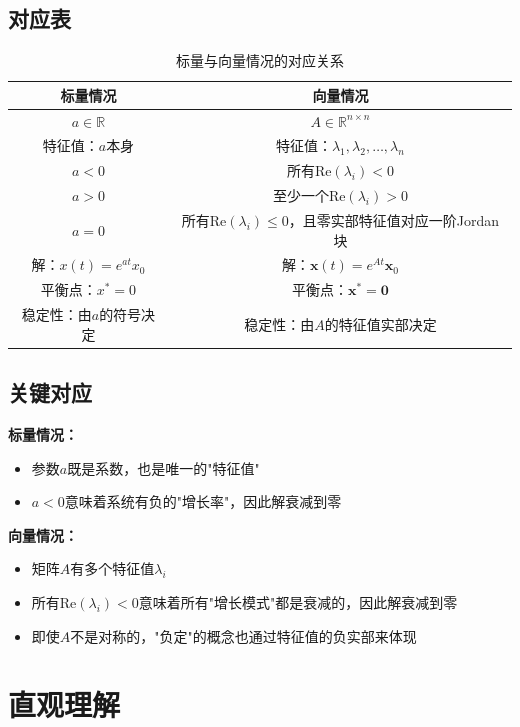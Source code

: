 \documentclass[12pt,a4paper]{article}
\begin{document}
\subsection{对应表}

\begin{table}[h]
\centering
\begin{tabular}{|c|c|}
\hline
\textbf{标量情况} & \textbf{向量情况} \\
\hline
$a \in \mathbb{R}$ & $A \in \mathbb{R}^{n \times n}$ \\
\hline
特征值：$a$本身 & 特征值：$\lambda_1, \lambda_2, \ldots, \lambda_n$ \\
\hline
$a < 0$ & 所有$\text{Re}(\lambda_i) < 0$ \\
\hline
$a > 0$ & 至少一个$\text{Re}(\lambda_i) > 0$ \\
\hline
$a = 0$ & 所有$\text{Re}(\lambda_i) \leq 0$，且零实部特征值对应一阶Jordan块 \\
\hline
解：$x(t) = e^{at}x_0$ & 解：$\mathbf{x}(t) = e^{At}\mathbf{x}_0$ \\
\hline
平衡点：$x^* = 0$ & 平衡点：$\mathbf{x}^* = \mathbf{0}$ \\
\hline
稳定性：由$a$的符号决定 & 稳定性：由$A$的特征值实部决定 \\
\hline
\end{tabular}
\caption{标量与向量情况的对应关系}
\end{table}

\subsection{关键对应}

\textbf{标量情况：}
\begin{itemize}
\item 参数$a$既是系数，也是唯一的"特征值"
\item $a < 0$意味着系统有负的"增长率"，因此解衰减到零
\end{itemize}

\textbf{向量情况：}
\begin{itemize}
\item 矩阵$A$有多个特征值$\lambda_i$
\item 所有$\text{Re}(\lambda_i) < 0$意味着所有"增长模式"都是衰减的，因此解衰减到零
\item 即使$A$不是对称的，"负定"的概念也通过特征值的负实部来体现
\end{itemize}

\section{直观理解}
\end{document}

